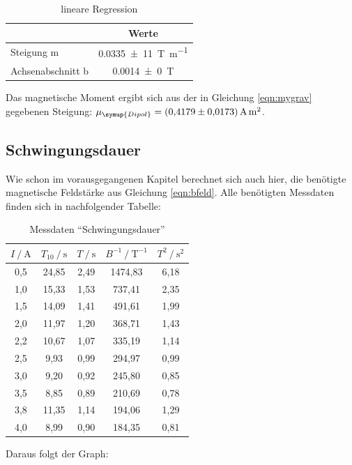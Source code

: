 \begin{table}[H]
  \centering
  \caption{lineare Regression}
  \label{tab:lin1}
  \begin{tabular}{l c}
    \toprule
       & {Werte}\\
    \midrule
    Steigung m & \SI{0,0335(11)}{\tesla \per \meter} \\
    Achsenabschnitt b & \SI{0,0014(0)}{\tesla} \\
    \bottomrule
  \end{tabular}
\end{table}
Das magnetische Moment ergibt sich aus der in Gleichung \eqref{eqn:mygrav} gegebenen Steigung:
$\mu_{\symup{Dipol}} = \SI{0,4179(173)}{\ampere \square \meter}$.

\subsection{Schwingungsdauer}
Wie schon im vorausgegangenen Kapitel berechnet sich auch hier, die benötigte magnetische Feldstärke
aus Gleichung \eqref{eqn:bfeld}.
Alle benötigten Messdaten finden sich in nachfolgender Tabelle:
\begin{table}[H]
  \centering
  \caption{Messdaten \enquote{Schwingungsdauer}}
  \label{tab:schw}
  \begin{tabular}{S S S S S}
    \toprule
      {$I \:/\: \mathrm{A}$} & {$T_{10} \:/\: \mathrm{s}$} &
      {$T \:/\: \mathrm{s}$} & {$B^{-1} \:/\: \mathrm{T^{-1}}$} & {$T^2 \:/\: \mathrm{s^2}$}\\
    ,5  &	24,85  & 	2,49	&	 1474,83 &  6,18 \\
    1,0  &	15,33  & 	1,53	&	 737,41	 &	2,35 \\
    1,5  &	14,09  & 	1,41	&	 491,61	 &	1,99 \\
    2,0  &	11,97  & 	1,20	&	 368,71	 &	1,43 \\
    2,2  &	10,67  & 	1,07	&	 335,19	 &	1,14 \\
    2,5  &	9,93	 &  0,99	&	 294,97	 &	0,99 \\
    3,0  &	9,20	 &  0,92	&	 245,80	 &	0,85 \\
    3,5  &	8,85	 &  0,89	&	 210,69	 &	0,78 \\
    3,8  &	11,35  & 	1,14	&	 194,06	 &	1,29 \\
    4,0  &	8,99	 &  0,90	&	 184,35	 &	0,81 \\
    \bottomrule
  \end{tabular}
\end{table}
Daraus folgt der Graph:
